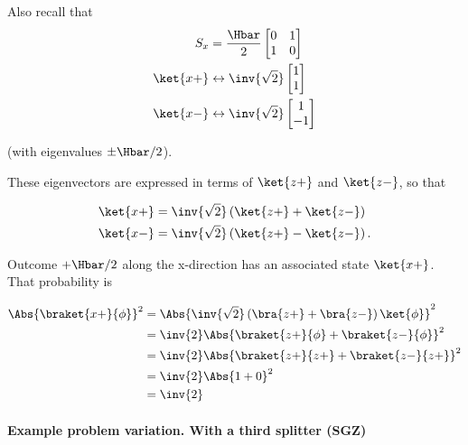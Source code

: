 Also recall that
\begin{equation}\label{eqn:PHY356Foct26:109}
\begin{aligned}
S_x &= \frac{\Hbar}{2}
\begin{bmatrix}
0 & 1 \\
1 & 0
\end{bmatrix} \\
\ket{x+} &\leftrightarrow
\inv{\sqrt{2}}
\begin{bmatrix}
1 \\
1
\end{bmatrix} \\
\ket{x-} &\leftrightarrow
\inv{\sqrt{2}}
\begin{bmatrix}
1 \\
-1
\end{bmatrix}
\end{aligned}
\end{equation}

(with eigenvalues \(\pm\Hbar/2\)).

These eigenvectors are expressed in terms of \(\ket{z+}\) and \(\ket{z-}\), so that

\begin{equation}\label{eqn:PHY356Foct26:110}
\begin{aligned}
\ket{x+}
&=
\inv{\sqrt{2}} \left( \ket{z+} + \ket{z-} \right) \\
\ket{x-}
&=
\inv{\sqrt{2}} \left( \ket{z+} - \ket{z-} \right) .
\end{aligned}
\end{equation}

Outcome \(+\Hbar/2\) along the x-direction has an associated state \(\ket{x+}\).  That probability is

\begin{equation}\label{eqn:lecture7sternGerlach:220}
\begin{aligned}
\Abs{\braket{x+}{\phi}}^2
&=
\Abs{
\inv{\sqrt{2}} \left( \bra{z+} + \bra{z-} \right) \ket{\phi}
}^2 \\
&=
\inv{2}
\Abs{
\braket{z+}{\phi} + \braket{z-}{\phi}
}^2 \\
&=
\inv{2}
\Abs{
\braket{z+}{z+} + \braket{z-}{z+}
}^2 \\
&=
\inv{2}
\Abs{
1 + 0
}^2 \\
&=
\inv{2}
\end{aligned}
\end{equation}

\paragraph{Example problem variation.  With a third splitter (SGZ)}

